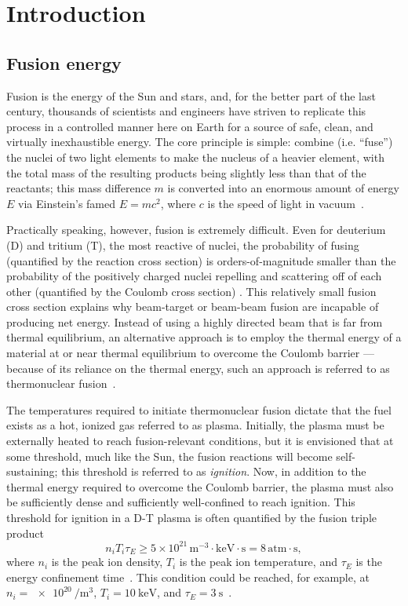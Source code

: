 \chapter{Introduction}
\label{ch:Introduction}


\section{Fusion energy}
Fusion is the energy of the Sun and stars, and,
for the better part of the last century,
thousands of scientists and engineers have striven
to replicate this process in a controlled manner here on Earth
for a source of safe, clean, and virtually inexhaustible energy.
The core principle is simple:
combine (i.e. ``fuse'') the nuclei of two light elements
to make the nucleus of a heavier element,
with the total mass of the resulting products
being slightly less than that of the reactants;
this mass difference $m$
is converted into an enormous amount of energy $E$
via Einstein's famed $E = m c^2$, where
$c$ is the speed of light in vacuum~\cite[Ch.~14]{krane}.

Practically speaking, however, fusion is extremely difficult.
Even for deuterium (D) and tritium (T), the most reactive of nuclei,
the probability of fusing
(quantified by the reaction cross section)
is orders-of-magnitude smaller than
the probability of the positively charged nuclei
repelling and scattering off of each other
(quantified by the Coulomb cross section)
\cite[Sec.~9.3.4]{freidberg_fusion_energy}.
This relatively small fusion cross section explains why
beam-target or beam-beam fusion are incapable of producing net energy.
Instead of using a highly directed beam that is far from thermal equilibrium,
an alternative approach is to employ the thermal energy
of a material at or near thermal equilibrium
to overcome the Coulomb barrier ---
because of its reliance on the thermal energy,
such an approach is referred to as thermonuclear fusion~\cite[Ch.~14]{krane}.

The temperatures required to initiate thermonuclear fusion
dictate that the fuel exists as a hot, ionized gas
referred to as plasma.
Initially, the plasma must be externally heated
to reach fusion-relevant conditions, but
it is envisioned that at some threshold, much like the Sun,
the fusion reactions will become self-sustaining;
this threshold is referred to as \emph{ignition}.
Now, in addition to the thermal energy
required to overcome the Coulomb barrier,
the plasma must also be sufficiently dense and
sufficiently well-confined
to reach ignition.
This threshold for ignition in a D-T plasma is often quantified
by the fusion triple product
\begin{equation}
  n_{i} T_{i} \tau_E
  \geq
  5 \times 10^{21} \, \text{m}^{-3} \cdot \text{keV} \cdot \text{s}
  =
  8 \, \text{atm} \cdot \text{s},
  \label{eq:Introduction:fusion_triple_product}
\end{equation}
where
$n_{i}$ is the peak ion density,
$T_{i}$ is the peak ion temperature, and
$\tau_E$ is the energy confinement time~\cite[Sec.~1.1]{wesson}.
This condition could be reached, for example, at
$n_i = \SI{e20}{\per\meter\cubed}$,
$T_i = \SI{10}{\kilo\eV}$, and
$\tau_E = \SI{3}{\second}$~\cite[Sec.~1.3]{wesson}.

